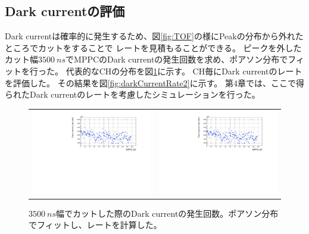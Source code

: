 \subsection{Dark currentの評価}
Dark currentは確率的に発生するため、図\ref{fig:TOF}の様にPeakの分布から外れたところでカットをすることで
レートを見積もることができる。
ピークを外したカット幅$\SI{3500}{ns}$でMPPCのDark currentの発生回数を求め、ポアソン分布でフィットを行った。
代表的なCHの分布を図\ref{fig:darkCurrentRate1}に示す。
CH毎にDark currentのレートを評価した。
その結果を図\ref{fig:darkCurrentRate2}に示す。
第4章では、ここで得られたDark currentのレートを考慮したシミュレーションを行った。

\begin{figure}
  \begin{tabular}{cc}
    \begin{minipage}[t]{0.45\hsize}
      \centering
      \includegraphics[keepaspectratio, scale=0.3, page=2]{images/chapter3/darkCurrentRate.pdf}
    \end{minipage}
    &
    \begin{minipage}[t]{0.45\hsize}
      \centering
      \includegraphics[keepaspectratio, scale=0.3, page=3]{images/chapter3/darkCurrentRate.pdf}
    \end{minipage}
  \end{tabular}
  \caption{$\SI{3500}{ns}$幅でカットした際のDark currentの発生回数。ポアソン分布でフィットし、レートを計算した。}
  \label{fig:darkCurrentRate1}
\end{figure}

